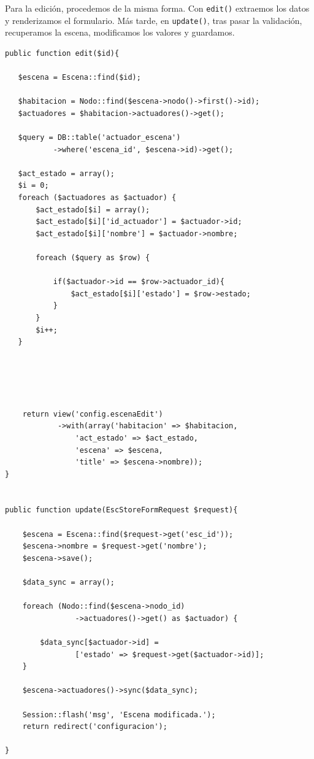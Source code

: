    Para la edición, procedemos de la misma forma. Con \lstinline|edit()| extraemos los datos y renderizamos el formulario. Más tarde, en \lstinline|update()|, tras pasar la validación, recuperamos la escena, modificamos los valores y guardamos.
   
   \begin{lstlisting}
public function edit($id){

   $escena = Escena::find($id);
   
   $habitacion = Nodo::find($escena->nodo()->first()->id);
   $actuadores = $habitacion->actuadores()->get();
   
   $query = DB::table('actuador_escena')
           ->where('escena_id', $escena->id)->get();
           
   $act_estado = array();
   $i = 0;
   foreach ($actuadores as $actuador) {
       $act_estado[$i] = array();
       $act_estado[$i]['id_actuador'] = $actuador->id;
       $act_estado[$i]['nombre'] = $actuador->nombre;
   
       foreach ($query as $row) {
   
           if($actuador->id == $row->actuador_id){
               $act_estado[$i]['estado'] = $row->estado;
           }
       }
       $i++;
   }





    return view('config.escenaEdit')
            ->with(array('habitacion' => $habitacion,
                'act_estado' => $act_estado,
                'escena' => $escena,
                'title' => $escena->nombre));
}


public function update(EscStoreFormRequest $request){

    $escena = Escena::find($request->get('esc_id'));
    $escena->nombre = $request->get('nombre');
    $escena->save();
    
    $data_sync = array();
    
    foreach (Nodo::find($escena->nodo_id)
                ->actuadores()->get() as $actuador) {
                
        $data_sync[$actuador->id] = 
                ['estado' => $request->get($actuador->id)];
    }
    
    $escena->actuadores()->sync($data_sync);
    
    Session::flash('msg', 'Escena modificada.');
    return redirect('configuracion');

}
\end{lstlisting}

